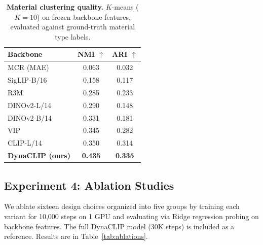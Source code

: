 \documentclass{article}
\newcommand{\methodname}{DynaCLIP}
\begin{document}
\begin{table}[h]
\centering
\caption{\textbf{Material clustering quality.} $K$-means ($K{=}10$) on frozen backbone features, evaluated against ground-truth material type labels.}
\label{tab:clustering}
\begin{tabular}{lcc}
\toprule
\textbf{Backbone} & \textbf{NMI $\uparrow$} & \textbf{ARI $\uparrow$} \\
\midrule
MCR (MAE)~\cite{radosavovic2023vc1} & 0.063 & 0.032 \\
SigLIP-B/16       & 0.158 & 0.117 \\
R3M~\cite{nair2022r3m}             & 0.285 & 0.233 \\
DINOv2-L/14       & 0.290 & 0.148 \\
DINOv2-B/14       & 0.331 & 0.181 \\
VIP~\cite{ma2022vip}             & 0.345 & 0.282 \\
CLIP-L/14         & 0.350 & 0.314 \\
\midrule
\textbf{\methodname{} (ours)} & \textbf{0.435} & \textbf{0.335} \\
\bottomrule
\end{tabular}
\end{table}


\subsection{Experiment 4: Ablation Studies}
\label{sec:exp4}

We ablate sixteen design choices organized into five groups by training each variant for 10{,}000 steps on 1 GPU and evaluating via Ridge regression probing on backbone features. The full \methodname{} model (30K steps) is included as a reference. Results are in Table~\ref{tab:ablations}.
\end{document}
